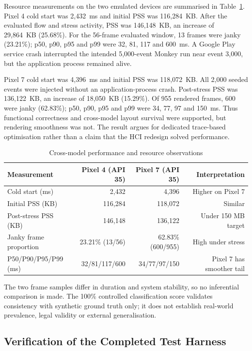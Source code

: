 Resource measurements on the two emulated devices are summarised in Table~\ref{tab:ch5-cross-model}. Pixel 4 cold start was 2,432~ms and initial PSS was 116,284~KB. After the evaluated flow and stress activity, PSS was 146,148~KB, an increase of 29,864~KB (25.68\%). For the 56-frame evaluated window, 13 frames were janky (23.21\%); p50, p90, p95 and p99 were 32, 81, 117 and 600~ms. A Google Play service crash interrupted the intended 5,000-event Monkey run near event 3,000, but the application process remained alive.

Pixel 7 cold start was 4,396~ms and initial PSS was 118,072~KB. All 2,000 seeded events were injected without an application-process crash. Post-stress PSS was 136,122~KB, an increase of 18,050~KB (15.29\%). Of 955 rendered frames, 600 were janky (62.83\%); p50, p90, p95 and p99 were 34, 77, 97 and 150~ms. Thus functional correctness and cross-model layout survival were supported, but rendering smoothness was not. The result argues for dedicated trace-based optimisation rather than a claim that the HCI redesign solved performance.

\begin{table}[H]
\centering
\caption{Cross-model performance and resource observations}
\label{tab:ch5-cross-model}
\small
\begin{tabular}{lrrr}
\toprule
\textbf{Measurement} & \textbf{Pixel 4 (API 35)} & \textbf{Pixel 7 (API 35)} & \textbf{Interpretation} \\
\midrule
Cold start (ms) & 2,432 & 4,396 & Higher on Pixel 7 \\
Initial PSS (KB) & 116,284 & 118,072 & Similar \\
Post-stress PSS (KB) & 146,148 & 136,122 & Under 150 MB target \\
Janky frame proportion & 23.21\% (13/56) & 62.83\% (600/955) & High under stress \\
P50/P90/P95/P99 (ms) & 32/81/117/600 & 34/77/97/150 & Pixel 7 has smoother tail \\
\bottomrule
\end{tabular}
\end{table}

The two frame samples differ in duration and system stability, so no inferential comparison is made. The 100\% controlled classification score validates consistency with synthetic ground truth only; it does not establish real-world prevalence, legal validity or external generalisation.

\subsection{Verification of the Completed Test Harness}

